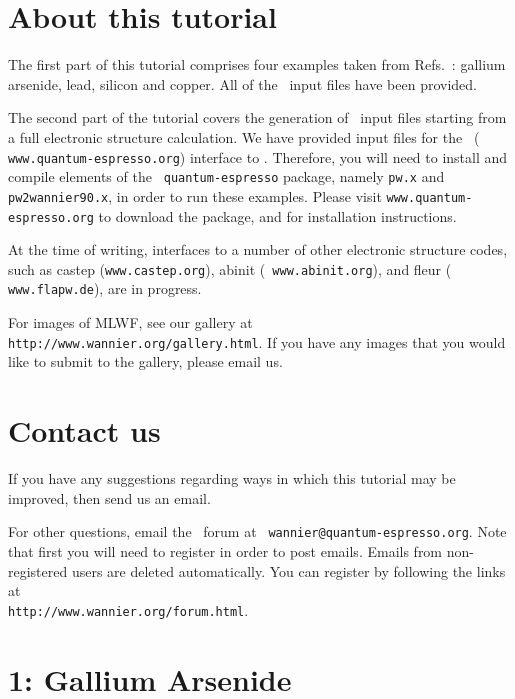 \documentclass[a4paper,11pt,twoside]{article}
\begin{document}
\section*{About this tutorial}

The first part of this tutorial comprises four examples taken from
Refs.~\cite{MV,SMV}: gallium arsenide, lead, silicon and copper. All
of the \wannier\ input files have been provided.

The second part of the tutorial covers the generation of \wannier\
input files starting from a full electronic structure calculation. We
have provided input files for the \pwscf\ ({\tt
  www.quantum-espresso.org}) interface to \wannier. Therefore, you
will need to install and compile elements of the {\tt
  quantum-espresso} package, namely {\tt pw.x} and {\tt
  pw2wannier90.x}, in order to run these
examples. Please visit {\tt www.quantum-espresso.org} to download the
package, and for installation instructions. 

At the time of
writing, interfaces to a number of other electronic structure codes,
such as {\sc 
  castep} ({\tt www.castep.org}), {\sc abinit} ({\tt
  www.abinit.org}), and {\sc fleur} ({\tt
  www.flapw.de}), are in progress.

For images of MLWF, see our gallery at {\tt
  http://www.wannier.org/gallery.html}. If you have any images that
  you would like to submit to the gallery, please email us.

\section*{Contact us}

If you have any suggestions regarding ways in which this tutorial may
be improved, then send us an email.

For other questions, email the \wannier\ forum at {\tt
  wannier@quantum-espresso.org}.  Note that first you will need to
register in order to post emails. Emails from non-registered users are
deleted automatically. You can register by following the links at\\
{\tt http://www.wannier.org/forum.html}.



\cleardoublepage

\section*{1: Gallium Arsenide}
\end{document}
